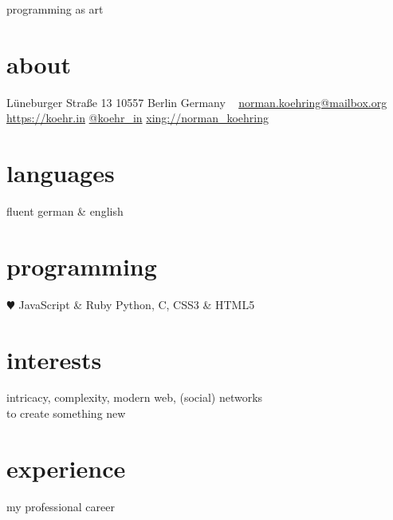 \documentclass[]{friggeri-cv}
\begin{document}
       {programming as art}


\begin{aside}
  \section{about}
    Lüneburger Straße 13
    10557 Berlin
    Germany
    ~
    \href{mailto:norman.koehring@mailbox.org}{norman.koehring@mailbox.org}
    \href{https://koehr.in}{https://koehr.in}
    \href{https://twitter.com/koehr_in}{@koehr_in}
    \href{https://www.xing.com/profiles/Norman_Koehring}{xing://norman\_koehring}
  \section{languages}
    fluent german \& english
  \section{programming}
    {\color{red} $\varheartsuit$} JavaScript \& Ruby
    Python, C,
    CSS3 \& HTML5
\end{aside}

\section{interests}

intricacy, complexity, modern web, (social) networks\\
to create something new

\section{experience}
my professional career
\end{document}
